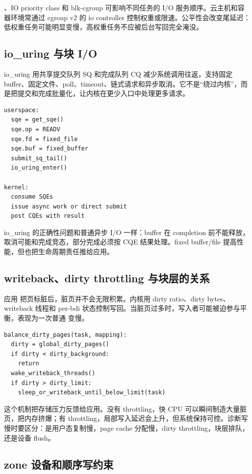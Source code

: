 、IO priority class 和 blk-cgroup 可影响不同任务的 I/O 服务顺序。云主机和容器环境常通过 cgroup v2 的 io controller 控制权重或限速。公平性会改变尾延迟：低权重任务可能明显变慢，高权重任务不应被后台写回完全淹没。

\subsection{io\_uring 与块 I/O}

io\_uring 用共享提交队列 SQ 和完成队列 CQ 减少系统调用往返，支持固定 buffer、固定文件、poll、timeout、链式请求和异步取消。它不是“绕过内核”，而是把提交和完成批量化，让内核在更少入口中处理更多请求。

\begin{lstlisting}
userspace:
  sqe = get_sqe()
  sqe.op = READV
  sqe.fd = fixed_file
  sqe.buf = fixed_buffer
  submit_sq_tail()
  io_uring_enter()

kernel:
  consume SQEs
  issue async work or direct submit
  post CQEs with result
\end{lstlisting}

io\_uring 的正确性问题和普通异步 I/O 一样：buffer 在 completion 前不能释放，取消可能和完成竞态，部分完成必须按 CQE 结果处理。fixed buffer/file 提高性能，但也把生命周期责任推给应用。

\subsection{writeback、dirty throttling 与块层的关系}

应用  把页标脏后，脏页并不会无限积累。内核用 dirty ratio、dirty bytes、writeback 线程和 per-bdi 状态控制写回。当脏页过多时，写入者可能被迫参与平衡，表现为一次普通  变慢。

\begin{lstlisting}
balance_dirty_pages(task, mapping):
  dirty = global_dirty_pages()
  if dirty < dirty_background:
    return
  wake_writeback_threads()
  if dirty > dirty_limit:
    sleep_or_writeback_until_below_limit(task)
\end{lstlisting}

这个机制把存储压力反馈给应用。没有 throttling，快 CPU 可以瞬间制造大量脏页，把内存挤爆；有 throttling，局部写入延迟会上升，但系统保持可控。诊断写慢时要区分：是用户态复制慢，page cache 分配慢，dirty throttling，块层排队，还是设备 flush。

\subsection{zone 设备和顺序写约束}


